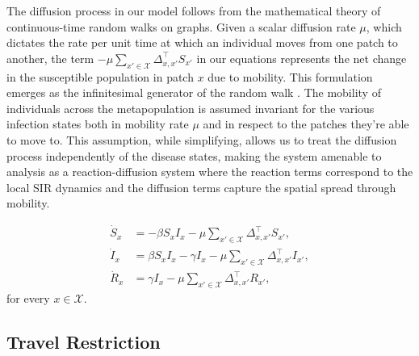 The diffusion process in our model follows from the mathematical theory of continuous-time random walks on graphs. Given a scalar diffusion rate $\mu$, which dictates the rate per unit time at which an individual moves from one patch to another, the term $-\mu \sum_{x' \in \mathcal{X}} \Delta_{x,x'}^{\top} S_{x'}$ in our equations represents the net change in the susceptible population in patch $x$ due to mobility. This formulation emerges as the infinitesimal generator of the random walk \cite{masuda2017random}. The mobility of individuals across the metapopulation is assumed invariant for the various infection states both in mobility rate $\mu$ and in respect to the patches they're able to move to. This assumption, while simplifying, allows us to treat the diffusion process independently of the disease states, making the system amenable to analysis as a reaction-diffusion system where the reaction terms correspond to the local SIR dynamics and the diffusion terms capture the spatial spread through mobility.

\begin{equation}
\begin{aligned}
    \dot{S}_{x} &= -\beta S_{x} I_{x} - \mu \sum_{x' \in \mathcal{X}} \Delta_{x,x'}^{\top} S_{x'}, \\
    \dot{I}_{x} &= \beta S_{x} I_{x} - \gamma I_{x} - \mu \sum_{x' \in \mathcal{X}} \Delta_{x,x'}^{\top} I_{x'}, \\
    \dot{R}_{x} &= \gamma I_{x} - \mu \sum_{x' \in \mathcal{X}} \Delta_{x,x'}^{\top} R_{x'},
\end{aligned}
\end{equation}
for every $x \in \mathcal{X}$.



\subsection{Travel Restriction} %

